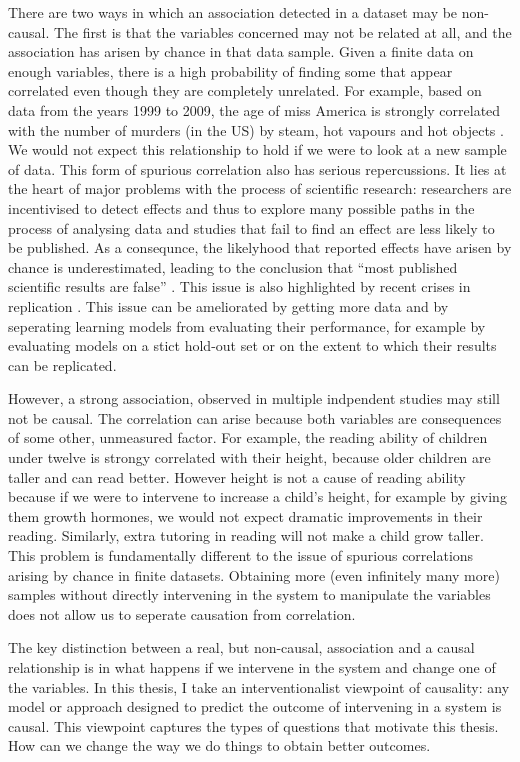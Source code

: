 \documentclass[11pt,a4paper,oneside]{book}
\newcommand{\quotes}[1]{``#1''}
\theoremstyle{plain}
\theoremstyle{definition}
\begin{document}
There are two ways in which an association detected in a dataset may be non-causal. The first is that the variables concerned may not be related at all, and the association has arisen by chance in that data sample. Given a finite data on enough variables, there is a high probability of finding some that appear correlated even though they are completely unrelated. For example, based on data from the years 1999 to 2009, the age of miss America is strongly correlated with the number of murders  (in the US) by steam, hot vapours and hot objects \citep{Vigen2015}. We would not expect this relationship to hold if we were to look at a new sample of data. This form of spurious correlation also has serious repercussions. It lies at the heart of major problems with the process of scientific research: researchers are incentivised to detect effects and thus to explore many possible paths in the process of analysing data and studies that fail to find an effect are less likely to be published. As a consequnce, the likelyhood that reported effects have arisen by chance is underestimated, leading to the conclusion that \quotes{most published scientific results are false} \citep{Ioannidis2005}. This issue is also highlighted by recent crises in replication \citep{OpenScienceCollaboration2015}. This issue can be ameliorated by getting more data and by seperating learning models from evaluating their performance, for example by evaluating models on a stict hold-out set or on the extent to which their results can be replicated. 

However, a strong association, observed in multiple indpendent studies may still not be causal. The correlation can arise because both variables are consequences of some other, unmeasured factor. For example, the reading ability of children under twelve is strongy correlated with their height, because older children are taller and can read better. However height is not a cause of reading ability because if we were to intervene to increase a child's height, for example by giving them growth hormones, we would not expect dramatic improvements in their reading. Similarly, extra tutoring in reading will not make a child grow taller. This problem is fundamentally different to the issue of spurious correlations arising by chance in finite datasets. Obtaining more (even infinitely many more) samples without directly intervening in the system to manipulate the variables does not allow us to seperate causation from correlation. 

The key distinction between a real, but non-causal, association and a causal relationship is in what happens if we intervene in the system and change one of the variables. In this thesis, I take an interventionalist viewpoint of causality: any model or approach designed to predict the outcome of intervening in a system is causal. This viewpoint captures the types of questions that motivate this thesis. How can we change the way we do things to obtain better outcomes. 
\end{document}
